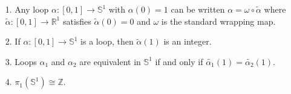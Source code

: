 \documentclass[a4paper,12pt,twoside]{hmcpset}
\begin{document}
\begin{problem}[Theorem 13.14]
    \begin{itemize}
        \item[1.] Any loop $\alpha: [0, 1] \to \mathbb{S}^1$ with
        $\alpha(0) = 1$ can be written $\alpha = \omega \circ
        \tilde{\alpha}$ where $\tilde{\alpha}:[0, 1] \to \mathbb{R}^1$
        satisfies $\tilde{\alpha}(0) = 0$ and $\omega$ is the standard
        wrapping map.
        
        \item[2.] If $\alpha : [0, 1] \to \mathbb{S}^1$ is a loop,
        then $\tilde{\alpha}(1)$ is an integer.

        \item[3.] Loops $\alpha_1$ and $\alpha_2$ are equivalent in
        $\mathbb{S}^1$ if and only if $\tilde{\alpha_1}(1) =
        \tilde{\alpha_2}(1).$
        
        \item [4.] $\pi_1(\mathbb{S}^1) \cong \mathbb{Z}$.
    \end{itemize}
\end{problem}
\end{document}
